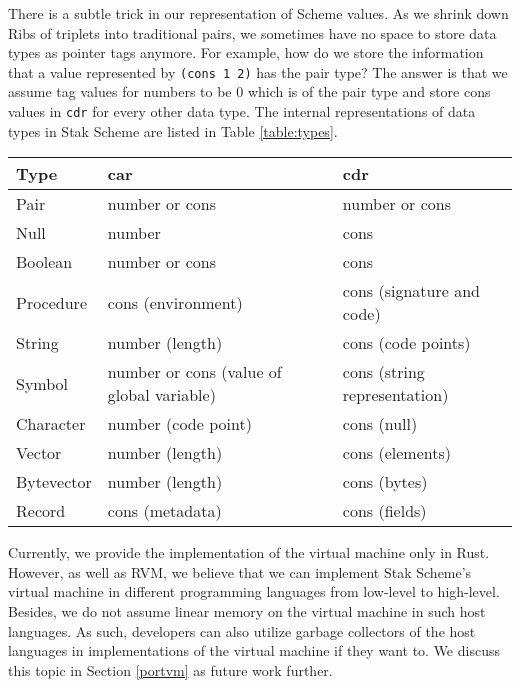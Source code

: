 \documentclass[sigplan, anonymous, review]{acmart}
\begin{document}
There is a subtle trick in our representation of Scheme values.
As we shrink down Ribs of triplets into traditional pairs, we sometimes
have no space to store data types as pointer tags anymore.
For example, how do we store the information that a value represented
by \texttt{(cons 1 2)} has the pair type?
The answer is that we assume tag values for numbers to be 0 which is of
the pair type
and store cons values in \texttt{cdr} for every other data type.
The internal representations of data types in Stak Scheme are listed
in Table \ref{table:types}.

\begin{table*}
  \begin{center}
    \caption{Internal representation of Scheme values}
    \label{table:types}
    \begin{tabular}{lll}
      \hline
      Type & car & cdr \\
      \hline
      Pair & number or cons & number or cons \\
      Null & number & cons \\
      Boolean & number or cons & cons \\
      Procedure & cons (environment) & cons (signature and code) \\
      String & number (length) & cons (code points) \\
      Symbol & number or cons (value of global variable) & cons
      (string representation) \\
      Character & number (code point) & cons (null) \\
      Vector & number (length) & cons (elements) \\
      Bytevector & number (length) & cons (bytes) \\
      Record & cons (metadata) & cons (fields) \\
      \hline
    \end{tabular}
  \end{center}
\end{table*}

Currently, we provide the implementation of the virtual machine only
in Rust.
However, as well as RVM, we believe that we can implement Stak Scheme's
virtual machine in different programming languages from low-level to high-level.
Besides, we do not assume linear memory on the virtual machine in such
host languages.
As such, developers can also utilize garbage collectors of
the host languages in implementations of the virtual machine if they want to.
We discuss this topic in Section \ref{portvm} as future work further.
\end{document}
